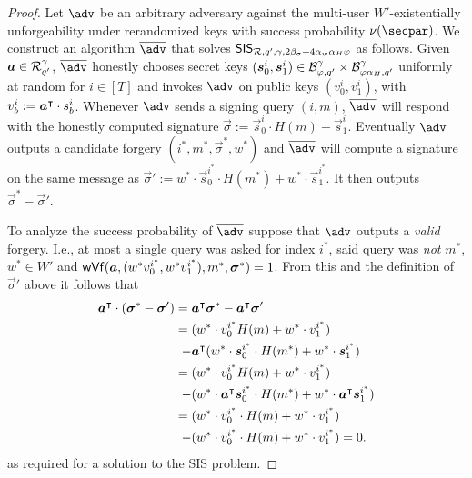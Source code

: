 \begin{proof}
  Let $\adv$ be an arbitrary adversary against the multi-user $W'$-existentially unforgeability under rerandomized keys with success probability $\nu(\secpar)$.
  We construct an algorithm $\sisadvkots$ that solves $\mathsf{SIS}_{\mathcal{R},q',\gamma,2\beta_\sigma + 4\alpha_w\alpha_H\varphi}$ as follows.
  Given $\boldsymbol{a}\in\mathcal{R}_{q'}^\gamma$, $\sisadvkots$ honestly chooses secret keys $(\boldsymbol{s}^i_0,\boldsymbol{s}^i_1) \in \mathcal{B}_{\varphi, q'}^\gamma\times \mathcal{B}_{\varphi\alpha_H, q'}^\gamma$ uniformly at random for $i\in[T]$ and invokes $\adv$ on public keys $(v^i_0,v^i_1)$, with $v^i_b := \boldsymbol{a}^\intercal\cdot s^i_b$.
  Whenever $\adv$ sends a signing query $(i,m)$, $\sisadvkots$ will respond with the honestly computed signature $\vec{\sigma}:=\vec{s}^i_0\cdot H(m)+ \vec{s}^i_1$.
  Eventually $\adv$ outputs a candidate forgery $(i^*,m^*,\vec{\sigma}^*,w^*)$ and $\sisadvkots$ will compute a signature on the same message as $\vec{\sigma}' := w^*\cdot\vec{s}^{i^*}_0\cdot H(m^*)+ w^*\cdot\vec{s}^{i^*}_1$.
  It then outputs $\vec{\sigma}^*-\vec{\sigma}'$.
  
  To analyze the success probability of $\sisadvkots$ suppose that $\adv$ outputs a \emph{valid} forgery.
  I.e., at most a single query was asked for index $i^*$, said query was \emph{not} $m^*$, $w^*\in W'$ and $\mathsf{wVf}(\boldsymbol{a},(w^*v^{i^*}_0,w^*v^{i^*}_1),m^*,\allowbreak\boldsymbol{\sigma}^*)=1$.
  From this and the definition of $\vec{\sigma}'$ above it follows that
  \begin{align*}
       \boldsymbol{a}^\intercal\cdot(\boldsymbol{\sigma}^*-\boldsymbol{\sigma}') ={}& \boldsymbol{a}^\intercal\boldsymbol{\sigma}^*-\boldsymbol{a}^\intercal\boldsymbol{\sigma}'\\ 
    ={}& (w^*\cdot v^{i^*}_0 H(m) + w^*\cdot v^{i^*}_1) \\
    - {}&\boldsymbol{a}^\intercal(w^*\cdot \boldsymbol{s}^{i^*}_0\cdot H(m^*)+ w^*\cdot\boldsymbol{s}^{i^*}_1)\\
    ={}& (w^*\cdot v^{i^*}_0 H(m) + w^*\cdot v^{i^*}_1) \\
    -{}& (w^*\cdot\boldsymbol{a}^\intercal\boldsymbol{s}^{i^*}_0\cdot H(m^*)+ w^*\cdot\boldsymbol{a}^\intercal\boldsymbol{s}^{i^*}_1)\\
    ={}& (w^*\cdot v^{i^*}_0\cdot H(m) + w^*\cdot v^{i^*}_1)\\
    -{}& (w^*\cdot v^{i^*}_0\cdot H(m) + w^*\cdot v^{i^*}_1) = 0.
  \end{align*}
  as required for a solution to the SIS problem.
  

\end{proof}
